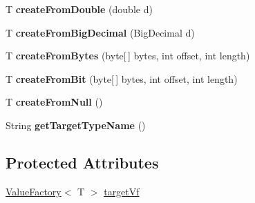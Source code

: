 \begin{DoxyCompactItemize}
\mbox{\label{classcom_1_1mysql_1_1cj_1_1result_1_1_base_decorating_value_factory_a7339df10ef5bc202ad0568b232afd530}} 
T {\bfseries create\+From\+Double} (double d)
\item 
\mbox{\label{classcom_1_1mysql_1_1cj_1_1result_1_1_base_decorating_value_factory_a59304834ff6d8d74b8555d2fcb70a46e}} 
T {\bfseries create\+From\+Big\+Decimal} (Big\+Decimal d)
\item 
\mbox{\label{classcom_1_1mysql_1_1cj_1_1result_1_1_base_decorating_value_factory_a36b451b3b030ef65417756206968626e}} 
T {\bfseries create\+From\+Bytes} (byte\mbox{[}$\,$\mbox{]} bytes, int offset, int length)
\item 
\mbox{\label{classcom_1_1mysql_1_1cj_1_1result_1_1_base_decorating_value_factory_ae424a4142df77302b0cc712d8d6b38be}} 
T {\bfseries create\+From\+Bit} (byte\mbox{[}$\,$\mbox{]} bytes, int offset, int length)
\item 
\mbox{\label{classcom_1_1mysql_1_1cj_1_1result_1_1_base_decorating_value_factory_aa7c19e3967273a1c5b806c858165200a}} 
T {\bfseries create\+From\+Null} ()
\item 
\mbox{\label{classcom_1_1mysql_1_1cj_1_1result_1_1_base_decorating_value_factory_a50680123fa3626dd2a9fbb6e4fd01f0b}} 
String {\bfseries get\+Target\+Type\+Name} ()
\end{DoxyCompactItemize}
\subsection*{Protected Attributes}
\begin{DoxyCompactItemize}
\item 
\mbox{\hyperlink{interfacecom_1_1mysql_1_1cj_1_1result_1_1_value_factory}{Value\+Factory}}$<$ T $>$ \mbox{\hyperlink{classcom_1_1mysql_1_1cj_1_1result_1_1_base_decorating_value_factory_a64c2c62bd9906ec3af7fc62e58bf34b3}{target\+Vf}}
\end{DoxyCompactItemize}


